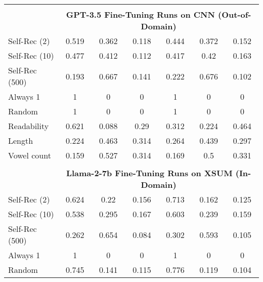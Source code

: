 \begin{table}[h]
\begin{tabular}{l|cccccc}
        \multicolumn{7}{c}{} \\
        \multicolumn{1}{c}{} & \multicolumn{6}{c}{\textbf{GPT-3.5 Fine-Tuning Runs on CNN (Out-of-Domain)}} \\
        Self-Rec (2)                       & 0.519       & 0.362     & 0.118        & 0.444       & 0.372     & 0.152       \\
        Self-Rec (10)                      & 0.477       & 0.412     & 0.112        & 0.417       & 0.42      & 0.163       \\
        Self-Rec (500)                     & 0.193       & 0.667     & 0.141        & 0.222       & 0.676     & 0.102       \\
        Always 1                           & 1           & 0         & 0            & 1           & 0         & 0           \\
        Random                             & 1           & 0         & 0            & 1           & 0         & 0           \\
        Readability                        & 0.621       & 0.088     & 0.29         & 0.312       & 0.224     & 0.464       \\
        Length                             & 0.224       & 0.463     & 0.314        & 0.264       & 0.439     & 0.297       \\
        Vowel count                        & 0.159       & 0.527     & 0.314        & 0.169       & 0.5       & 0.331       \\
        \multicolumn{7}{c}{} \\
        \multicolumn{1}{c}{} & \multicolumn{6}{c}{\textbf{Llama-2-7b Fine-Tuning Runs on XSUM (In-Domain)}} \\
        Self-Rec (2)                       & 0.624       & 0.22      & 0.156        & 0.713       & 0.162     & 0.125       \\
        Self-Rec (10)                      & 0.538       & 0.295     & 0.167        & 0.603       & 0.239     & 0.159       \\
        Self-Rec (500)                     & 0.262       & 0.654     & 0.084        & 0.302       & 0.593     & 0.105       \\
        Always 1                           & 1           & 0         & 0            & 1           & 0         & 0           \\
        Random                             & 0.745       & 0.141     & 0.115        & 0.776       & 0.119     & 0.104       \\

\end{tabular}
\end{table}
